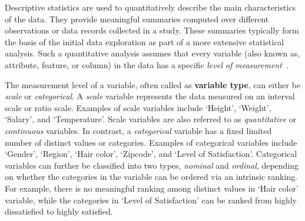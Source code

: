 \newcommand{\UnivarScriptName}{\texttt{\tt Univar-Stats.dml}}
\newcommand{\BivarScriptName}{\texttt{\tt bivar-stats.dml}}

\newcommand{\OutputRowIDMinimum}{1}
\newcommand{\OutputRowIDMaximum}{2}
\newcommand{\OutputRowIDRange}{3}
\newcommand{\OutputRowIDMean}{4}
\newcommand{\OutputRowIDVariance}{5}
\newcommand{\OutputRowIDStDeviation}{6}
\newcommand{\OutputRowIDStErrorMean}{7}
\newcommand{\OutputRowIDCoeffVar}{8}
\newcommand{\OutputRowIDQuartiles}{?, 13, ?}
\newcommand{\OutputRowIDMedian}{13}
\newcommand{\OutputRowIDIQMean}{14}
\newcommand{\OutputRowIDSkewness}{9}
\newcommand{\OutputRowIDKurtosis}{10}
\newcommand{\OutputRowIDStErrorSkewness}{11}
\newcommand{\OutputRowIDStErrorCurtosis}{12}
\newcommand{\OutputRowIDNumCategories}{15}
\newcommand{\OutputRowIDMode}{16}
\newcommand{\OutputRowIDNumModes}{17}
\newcommand{\OutputRowText}[1]{\mbox{(output row~{#1})\hspace{0.5pt}:}}

\newcommand{\NameStatR}{Pearson's correlation coefficient}
\newcommand{\NameStatChi}{Pearson's~$\chi^2$}
\newcommand{\NameStatPChi}{$P\textrm{-}$value of Pearson's~$\chi^2$}
\newcommand{\NameStatV}{Cram\'er's~$V$}
\newcommand{\NameStatEta}{Eta statistic}
\newcommand{\NameStatF}{$F$~statistic}
\newcommand{\NameStatRho}{Spearman's rank correlation coefficient}

Descriptive statistics are used to quantitatively describe the main characteristics of the data.
They provide meaningful summaries computed over different observations or data records
collected in a study.  These summaries typically form the basis of the initial data exploration
as part of a more extensive statistical analysis.  Such a quantitative analysis assumes that
every variable (also known as, attribute, feature, or column) in the data has a specific
\emph{level of measurement}~\cite{Stevens1946:scales}.

The measurement level of a variable, often called as {\bf variable type}, can either be
\emph{scale} or \emph{categorical}.  A \emph{scale} variable represents the data measured on
an interval scale or ratio scale.  Examples of scale variables include `Height', `Weight',
`Salary', and `Temperature'.  Scale variables are also referred to as \emph{quantitative}
or \emph{continuous} variables.  In contrast, a \emph{categorical} variable has a fixed
limited number of distinct values or categories.  Examples of categorical variables
include `Gender', `Region', `Hair color', `Zipcode', and `Level of Satisfaction'.
Categorical variables can further be classified into two types, \emph{nominal} and
\emph{ordinal}, depending on whether the categories in the variable can be ordered via an
intrinsic ranking.  For example, there is no meaningful ranking among distinct values in
`Hair color' variable, while the categories in `Level of Satisfaction' can be ranked from
highly dissatisfied to highly satisfied.

